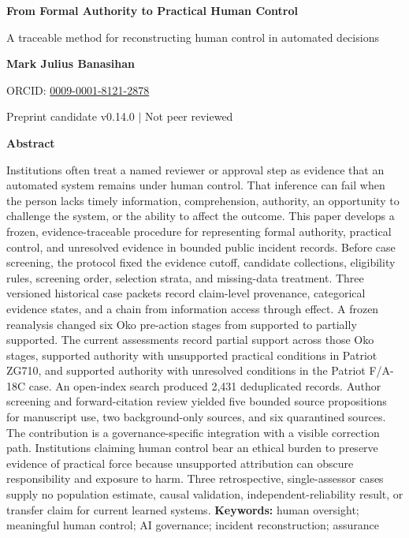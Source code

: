 \documentclass[11pt]{article}
\begin{document}
\begin{TAETitleBox}
\begin{center}
{\LARGE\bfseries\color{TAENavy} From Formal Authority to Practical Human Control\par}
\vspace{0.45em}
{\large A traceable method for reconstructing human control in automated decisions\par}
\vspace{1.0em}
{\normalsize\bfseries Mark Julius Banasihan\par}
{\small ORCID: \href{https://orcid.org/0009-0001-8121-2878}{0009-0001-8121-2878}\par}
\vspace{0.75em}
{\small Preprint candidate v0.14.0 $\vert$ Not peer reviewed\par}
\end{center}
\end{TAETitleBox}
\vspace{0.75em}
\begin{TAEAbstractBox}
{\small\textbf{Abstract}\par\medskip}
\small
Institutions often treat a named reviewer or approval step as evidence that an automated system remains under human control. That inference can fail when the person lacks timely information, comprehension, authority, an opportunity to challenge the system, or the ability to affect the outcome. This paper develops a frozen, evidence-traceable procedure for representing formal authority, practical control, and unresolved evidence in bounded public incident records. Before case screening, the protocol fixed the evidence cutoff, candidate collections, eligibility rules, screening order, selection strata, and missing-data treatment. Three versioned historical case packets record claim-level provenance, categorical evidence states, and a chain from information access through effect. A frozen reanalysis changed six Oko pre-action stages from supported to partially supported. The current assessments record partial support across those Oko stages, supported authority with unsupported practical conditions in Patriot ZG710, and supported authority with unresolved conditions in the Patriot F/A-18C case. An open-index search produced 2,431 deduplicated records. Author screening and forward-citation review yielded five bounded source propositions for manuscript use, two background-only sources, and six quarantined sources. The contribution is a governance-specific integration with a visible correction path. Institutions claiming human control bear an ethical burden to preserve evidence of practical force because unsupported attribution can obscure responsibility and exposure to harm. Three retrospective, single-assessor cases supply no population estimate, causal validation, independent-reliability result, or transfer claim for current learned systems.
\textbf{Keywords:} human oversight; meaningful human control; AI governance; incident reconstruction; assurance
\end{TAEAbstractBox}
\FloatBarrier
\end{document}
